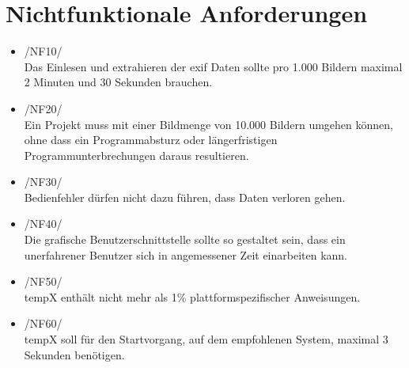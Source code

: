 \section{Nichtfunktionale Anforderungen}

\begin{itemize}
	\item /NF10/\\Das Einlesen und extrahieren der \gls{exif} Daten sollte pro 1.000 Bildern maximal 2 Minuten und 30 Sekunden brauchen.
	\item /NF20/\\Ein Projekt muss mit einer Bildmenge von 10.000 Bildern umgehen können, ohne dass ein Programmabsturz oder längerfristigen Programmunterbrechungen daraus resultieren.
	\item /NF30/\\Bedienfehler dürfen nicht dazu führen, dass Daten verloren gehen.
	\item /NF40/\\Die grafische Benutzerschnittstelle sollte so gestaltet sein, dass ein unerfahrener Benutzer sich in angemessener Zeit einarbeiten kann.
	\item /NF50/\\ \gls{tempX} enthält nicht mehr als 1\% plattformspezifischer Anweisungen.	
	\item /NF60/\\ \gls{tempX} soll für den Startvorgang, auf dem empfohlenen System, maximal 3 Sekunden benötigen.
\end{itemize}